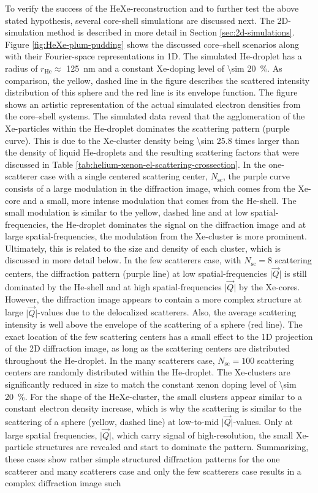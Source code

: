 To verify the success of the HeXe-reconstruction and to further test the above stated hypothesis, several core-shell simulations are discussed next. The 2D-simulation method is described in more detail in Section \ref{sec:2d-simulations}. Figure \ref{fig:HeXe-plum-pudding} shows the discussed core--shell scenarios along with their Fourier-space representations in 1D. The simulated He-droplet has a radius of $r_{\text{He}}\approx$ \SI{125}{\nano\meter} and a constant Xe-doping level of \SI{\sim 20}{\percent}. As comparison, the yellow, dashed line in the figure describes the scattered intensity distribution of this sphere and the red line is its envelope function. The figure shows an artistic representation of the actual simulated electron densities from the core--shell systems. The simulated data reveal that the agglomeration of the Xe-particles within the He-droplet dominates the scattering pattern (purple curve). This is due to the Xe-cluster density being \num{\sim 25.8} times larger than the density of liquid He-droplets and the resulting scattering factors that were discussed in Table \ref{tab:helium-xenon-el-scattering-crossection}. In the one-scatterer case with a single centered scattering center, $N_{\text{sc}}$, the purple curve consists of a large modulation in the diffraction image, which comes from the Xe-core and a small, more intense modulation that comes from the He-shell. The small modulation is similar to the yellow, dashed line and at low spatial-frequencies, the He-droplet dominates the signal on the diffraction image and at large spatial-frequencies, the modulation from the Xe-cluster is more prominent. Ultimately, this is related to the size and density of each cluster, which is discussed in more detail below. In the few scatterers case, with $N_{\text{sc}}=8$ scattering centers, the diffraction pattern (purple line) at low spatial-frequencies $\lvert\vec{Q}\rvert$ is still dominated by the He-shell and at high spatial-frequencies $\lvert\vec{Q}\rvert$ by the Xe-cores. However, the diffraction image appears to contain a more complex structure at large $\lvert\vec{Q}\rvert$-values due to the delocalized scatterers. Also, the average scattering intensity is well above the envelope of the scattering of a sphere (red line). The exact location of the few scattering centers has a small effect to the 1D projection of the 2D diffraction image, as long as the scattering centers are distributed throughout the He-droplet. In the many scatterers case, $N_{\text{sc}}=100$ scattering centers are randomly distributed within the He-droplet. The Xe-clusters are significantly reduced in size to match the constant xenon doping level of \SI{\sim 20}{\percent}. For the shape of the HeXe-cluster, the small clusters appear similar to a constant electron density increase, which is why the scattering is similar to the scattering of a sphere (yellow, dashed line) at low-to-mid $\lvert\vec{Q}\rvert$-values. Only at large spatial frequencies, $\lvert\vec{Q}\rvert$, which carry signal of high-resolution, the small Xe-particle structures are revealed and start to dominate the pattern. Summarizing, these cases show rather simple structured diffraction patterns for the one scatterer and many scatterers case and only the few scatterers case results in a complex diffraction image such 